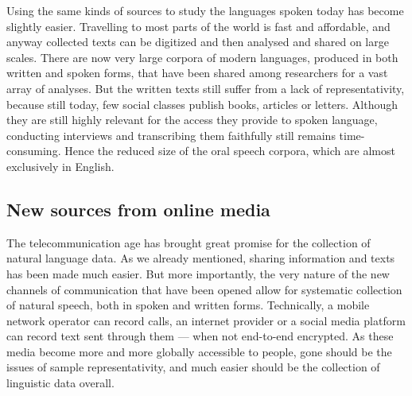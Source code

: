 \documentclass[../thesis.tex]{subfiles}
\begin{document}
Using the same kinds of sources to study the languages spoken today has become slightly
easier. Travelling to most parts of the world is fast and affordable, and anyway
collected texts can be digitized and then analysed and shared on large scales. There are
now very large corpora of modern languages, produced in both written
\cite{GrieveCorpusbasedRegional2009,GrieveRegionalVariation2016,BiberCorpusBasedInvestigations1996,McEnerySwearingModern2004}
and spoken
\cite{McEnerySwearingModern2004,SchweinbergerSwearingIrish2018,StenstromTrendsTeenage2002,LabovSocialStratification1966}
forms, that have been shared among researchers for a vast array of analyses. But the
written texts still suffer from a lack of representativity, because still today, few
social classes publish books, articles or letters. Although they are still highly
relevant for the access they provide to spoken language, conducting interviews and
transcribing them faithfully still remains time-consuming. Hence the reduced size of the
oral speech corpora, which are almost exclusively in English.


\subsection{New sources from online media}
The telecommunication age has brought great promise for the collection of natural
language data. As we already mentioned, sharing information and texts has been made much
easier. But more importantly, the very nature of the new channels of
communication that have been opened allow for systematic collection of natural speech,
both in spoken and written forms. Technically, a mobile network operator can record
calls, an internet provider or a social media platform can record text sent through them
--- when not end-to-end encrypted. As these media become more and more globally
accessible to people, gone should be the issues of sample representativity, and much
easier should be the collection of linguistic data overall.
\end{document}
